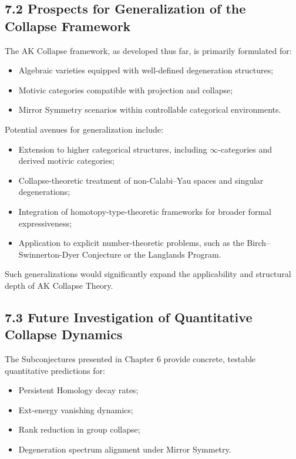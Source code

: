 \documentclass[11pt]{article}
\begin{document}
\subsection{7.2 Prospects for Generalization of the Collapse Framework}

The AK Collapse framework, as developed thus far, is primarily formulated for:

\begin{itemize}
    \item Algebraic varieties equipped with well-defined degeneration structures;
    \item Motivic categories compatible with projection and collapse;
    \item Mirror Symmetry scenarios within controllable categorical environments.
\end{itemize}

Potential avenues for generalization include:

\begin{itemize}
    \item Extension to higher categorical structures, including $\infty$-categories and derived motivic categories;
    \item Collapse-theoretic treatment of non-Calabi–Yau spaces and singular degenerations;
    \item Integration of homotopy-type-theoretic frameworks for broader formal expressiveness;
    \item Application to explicit number-theoretic problems, such as the Birch–Swinnerton-Dyer Conjecture or the Langlands Program.
\end{itemize}

Such generalizations would significantly expand the applicability and structural depth of AK Collapse Theory.

\subsection{7.3 Future Investigation of Quantitative Collapse Dynamics}

The Subconjectures presented in Chapter 6 provide concrete, testable quantitative predictions for:

\begin{itemize}
    \item Persistent Homology decay rates;
    \item Ext-energy vanishing dynamics;
    \item Rank reduction in group collapse;
    \item Degeneration spectrum alignment under Mirror Symmetry.
\end{itemize}
\end{document}
